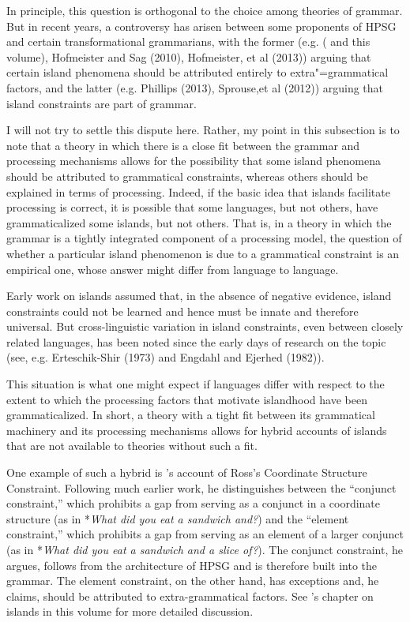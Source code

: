 \documentclass[a4paper]{article}
\begin{document}
In principle, this question is orthogonal to the choice among theories of grammar.  But in recent years, a controversy has arisen between some proponents of HPSG and certain transformational grammarians, with the former (e.g. \citeauthor{Chaves2012} (\citeyear{Chaves2012} and this volume), Hofmeister and Sag (2010), Hofmeister, et al (2013)) arguing that certain island phenomena should be attributed entirely to extra"=grammatical factors, and the latter (e.g. Phillips (2013), Sprouse,et al (2012)) arguing that island constraints are part of grammar.

I will not try to settle this dispute here.  Rather, my point in this subsection is to note that a theory in which there is a close fit between the grammar and processing mechanisms allows for the possibility that some island phenomena should be attributed to grammatical constraints, whereas others should be explained in terms of processing.  Indeed, if the basic idea that islands facilitate processing is correct, it is possible that some languages, but not others, have grammaticalized some islands, but not others.  That is, in a theory in which the grammar is a tightly integrated component of a processing model, the question of whether a particular island phenomenon is due to a grammatical constraint is an empirical one, whose answer might differ from language to language. 

Early work on islands assumed that, in the absence of negative evidence, island constraints could not be learned and hence must be innate and therefore universal.  But cross-linguistic variation in island constraints, even between closely related languages, has been noted since the early days of research on the topic (see, e.g. Erteschik-Shir (1973) and Engdahl and Ejerhed (1982)).

This situation is what one might expect if languages differ with respect to the extent to which the processing factors that motivate islandhood have been grammaticalized.  In short, a theory with a tight fit between its grammatical machinery and its processing mechanisms allows for hybrid accounts of islands that are not available to theories without such a fit.

One example of such a hybrid is \citeauthor{Chaves2012}'s \citeyearpar{Chaves2012} account of Ross's Coordinate Structure Constraint.  Following much earlier work, he distinguishes between the ``conjunct constraint,'' which prohibits a gap from serving as a conjunct in a coordinate structure (as in *{\it What did you eat a sandwich and?}) and the ``element constraint,'' which prohibits a gap from serving as an element of a larger conjunct (as in *{\it What did you eat a sandwich and a slice of?}).  The conjunct constraint, he argues, follows from the architecture of HPSG and is therefore built into the grammar.  The element constraint, on the other hand, has exceptions and, he claims, should be attributed to extra-grammatical factors.  See \citeauthor{Chaves2012}'s chapter on islands in this volume for more detailed discussion. 
\end{document}
